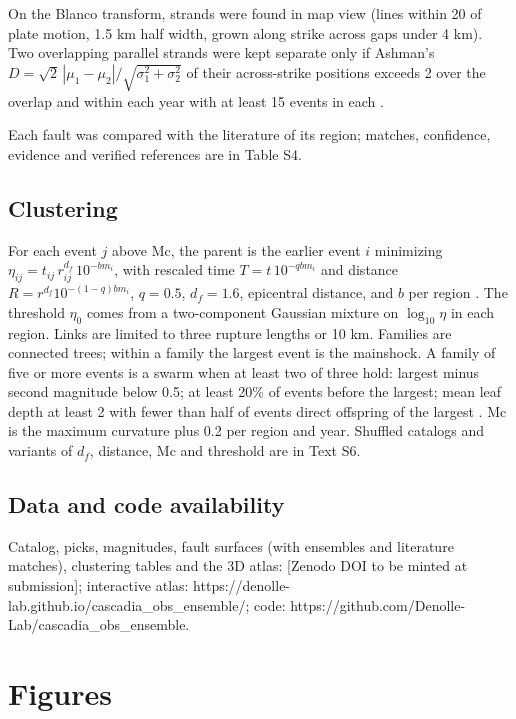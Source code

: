 \documentclass[11pt]{article}
\begin{document}
On the Blanco transform, strands were found in map view (lines within
20\textdegree{} of plate motion, 1.5 km half width, grown along strike across gaps
under 4 km). Two overlapping parallel strands were kept separate only if
Ashman's \(D = \sqrt{2}\,|\mu_1-\mu_2|/\sqrt{\sigma_1^2+\sigma_2^2}\) of
their across-strike positions exceeds 2 over the overlap and within each
year with at least 15 events in each \citep{Ashman1994}.

Each fault was compared with the literature of its region; matches,
confidence, evidence and verified references are in Table S4.

\subsection{Clustering}\label{clustering}

For each event \(j\) above Mc, the parent is the earlier event \(i\)
minimizing \(\eta_{ij} = t_{ij}\, r_{ij}^{d_f}\, 10^{-b m_i}\), with
rescaled time \(T = t\,10^{-q b m_i}\) and distance
\(R = r^{d_f} 10^{-(1-q) b m_i}\), \(q = 0.5\), \(d_f = 1.6\),
epicentral distance, and \(b\) per region
\citep{Baiesi2004, Zaliapin2008, Zaliapin2013a}. The threshold
\(\eta_0\) comes from a two-component Gaussian mixture on
\(\log_{10}\eta\) in each region. Links are limited to three rupture
lengths \citep{Wells1994} or 10 km. Families are connected trees; within
a family the largest event is the mainshock. A family of five or more
events is a swarm when at least two of three hold: largest minus second
magnitude below 0.5; at least 20\% of events before the largest; mean
leaf depth at least 2 with fewer than half of events direct offspring of
the largest \citep{Zaliapin2013, Vidale2006}. Mc is the maximum
curvature plus 0.2 per region and year. Shuffled catalogs and variants
of \(d_f\), distance, Mc and threshold are in Text S6.

\subsection{Data and code
availability}\label{data-and-code-availability}

Catalog, picks, magnitudes, fault surfaces (with ensembles and
literature matches), clustering tables and the 3D atlas: {[}Zenodo DOI
to be minted at submission{]}; interactive atlas:
https://denolle-lab.github.io/cascadia\_obs\_ensemble/; code:
https://github.com/Denolle-Lab/cascadia\_obs\_ensemble.


\clearpage
\section*{Figures}
\end{document}
